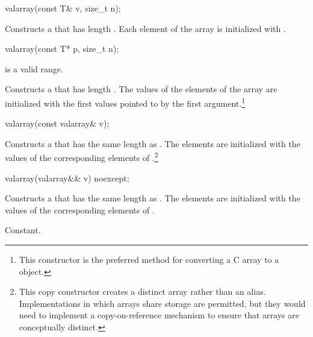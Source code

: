 %
\begin{itemdecl}
valarray(const T& v, size_t n);
\end{itemdecl}

\begin{itemdescr}
\pnum
\effects
Constructs a  that has length .
Each element of the array is initialized with .
\end{itemdescr}

%
\begin{itemdecl}
valarray(const T* p, size_t n);
\end{itemdecl}

\begin{itemdescr}

\pnum
\expects
{} is a valid range.

\effects
Constructs a  that has length .
The values of the elements of the array are initialized with the
first
values pointed to by the first argument.\footnote{This constructor is the
preferred method for converting a C array to a
object.}
\end{itemdescr}

%
\begin{itemdecl}
valarray(const valarray& v);
\end{itemdecl}

\begin{itemdescr}
\pnum
\effects
Constructs a  that has the same length as .
The elements are initialized with the values of the corresponding
elements of .\footnote{This copy constructor creates
a distinct array rather than an alias.
Implementations in which arrays share storage are permitted, but they
would need to implement a copy-on-reference mechanism to ensure that arrays are
conceptually distinct.}
\end{itemdescr}

%
\begin{itemdecl}
valarray(valarray&& v) noexcept;
\end{itemdecl}

\begin{itemdescr}
\pnum
\effects
Constructs a  that has the same length as .
The elements are initialized with the values of the corresponding
elements of .

\pnum
\complexity
Constant.
\end{itemdescr}

